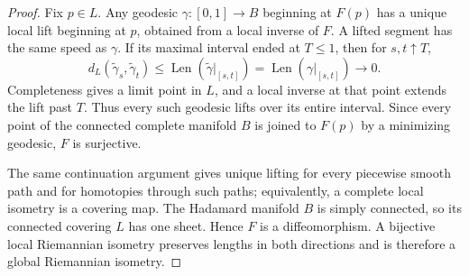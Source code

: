 \begin{proof}
Fix \(p\in L\).  Any geodesic \(\gamma:[0,1]\to B\) beginning at \(F(p)\)
has a unique local lift beginning at \(p\), obtained from a local inverse of
\(F\).  A lifted segment has the same speed as \(\gamma\).  If its maximal
interval ended at \(T\le1\), then for \(s,t\uparrow T\),
\[
  d_L(\widetilde\gamma_s,\widetilde\gamma_t)
  \le \operatorname{Len}(\widetilde\gamma|_{[s,t]})
  =\operatorname{Len}(\gamma|_{[s,t]})\longrightarrow0.
\]
Completeness gives a limit point in \(L\), and a local inverse at that point
extends the lift past \(T\).  Thus every such geodesic lifts over its entire
interval.  Since every point of the connected complete manifold \(B\) is
joined to \(F(p)\) by a minimizing geodesic, \(F\) is surjective.

The same continuation argument gives unique lifting for every piecewise
smooth path and for homotopies through such paths; equivalently, a complete
local isometry is a covering map.  The Hadamard manifold \(B\) is simply
connected, so its connected covering \(L\) has one sheet.  Hence \(F\) is a
diffeomorphism.  A bijective local Riemannian isometry preserves lengths in
both directions and is therefore a global Riemannian isometry.
\end{proof}

